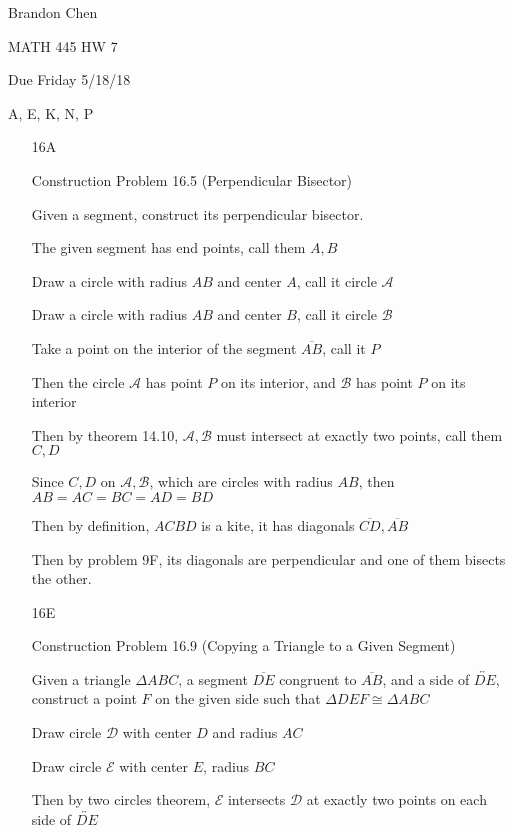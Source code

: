 \documentclass[11pt]{article}
\newcommand{\lines}[1]{\overleftrightarrow{#1}}
\newcommand{\segment}[1]{\overline{#1}}
\begin{document}
\noindent Brandon Chen

\noindent MATH 445 HW 7

\noindent Due Friday 5/18/18

 A, E, K, N, P

\begin{itemize}

	\item[16A]

		Construction Problem 16.5 (Perpendicular Bisector)
		
		Given a segment, construct its perpendicular bisector.

		The given segment has end points, call them $A,B$

		Draw a circle with radius $AB$ and center $A$, call it circle $\mathscr{A}$

		Draw a circle with radius $AB$ and center $B$, call it circle $\mathscr{B}$

		Take a point on the interior of the segment $\segment{AB}$, call it $P$

		Then the circle $\mathscr{A}$ has point $P$ on its interior, and $\mathscr{B}$ has point $P$ on its interior

		Then by theorem 14.10, $\mathscr{A}, \mathscr{B}$ must intersect at exactly two points, call them $C, D$

		Since $C,D$ on $\mathscr{A}, \mathscr{B}$, which are circles with radius $AB$, then $AB = AC = BC = AD = BD$

		Then by definition, $ACBD$ is a kite, it has diagonals $\segment{CD}, \segment{AB}$

		Then by problem 9F, its diagonals are perpendicular and one of them bisects the other.

	\item[16E]

		Construction Problem 16.9 (Copying a Triangle to a Given Segment)

		Given a triangle $\Delta ABC$, a segment $\segment{DE}$ congruent to $\segment{AB}$, and a side of $\lines{DE}$, construct a point $F$ on the given side such that $\Delta DEF \cong \Delta ABC$

		Draw circle $\mathscr{D}$ with center $D$ and radius $AC$

		Draw circle $\mathscr{E}$ with center $E$, radius $BC$

		Then by two circles theorem, $\mathscr{E}$ intersects $\mathscr{D}$ at exactly two points on each side of $\lines{DE}$


\end{itemize}
\end{document}
